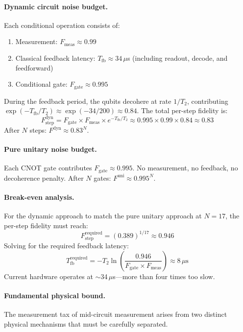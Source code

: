 \documentclass[11pt]{article}
\begin{document}
\paragraph{Dynamic circuit noise budget.}
Each conditional operation consists of:
\begin{enumerate}
  \item Measurement: $F_\text{meas} \approx 0.99$
  \item Classical feedback latency: $T_\text{fb} \approx 34\,\mu$s (including readout, decode, and feedforward)
  \item Conditional gate: $F_\text{gate} \approx 0.995$
\end{enumerate}
During the feedback period, the qubits decohere at rate $1/T_2$, contributing $\exp(-T_\text{fb}/T_2) \approx \exp(-34/200) \approx 0.84$.
The total per-step fidelity is:
\begin{equation}
F_\text{step}^\text{dyn} = F_\text{gate} \times F_\text{meas} \times e^{-T_\text{fb}/T_2} \approx 0.995 \times 0.99 \times 0.84 \approx 0.83
\end{equation}
After $N$ steps: $F^\text{dyn} \approx 0.83^N$.

\paragraph{Pure unitary noise budget.}
Each CNOT gate contributes $F_\text{gate} \approx 0.995$.
No measurement, no feedback, no decoherence penalty.
After $N$ gates: $F^\text{uni} \approx 0.995^N$.

\paragraph{Break-even analysis.}
For the dynamic approach to match the pure unitary approach at $N=17$, the per-step fidelity must reach:
\begin{equation}
F_\text{step}^\text{required} = (0.389)^{1/17} \approx 0.946
\end{equation}
Solving for the required feedback latency:
\begin{equation}
T_\text{fb}^\text{required} = -T_2 \ln\left(\frac{0.946}{F_\text{gate} \times F_\text{meas}}\right) \approx 8\,\mu\text{s}
\end{equation}
Current hardware operates at $\sim$34\,$\mu$s---more than four times too slow.

\paragraph{Fundamental physical bound.}
The measurement tax of mid-circuit measurement arises from two distinct physical mechanisms that must be carefully separated.
\end{document}
